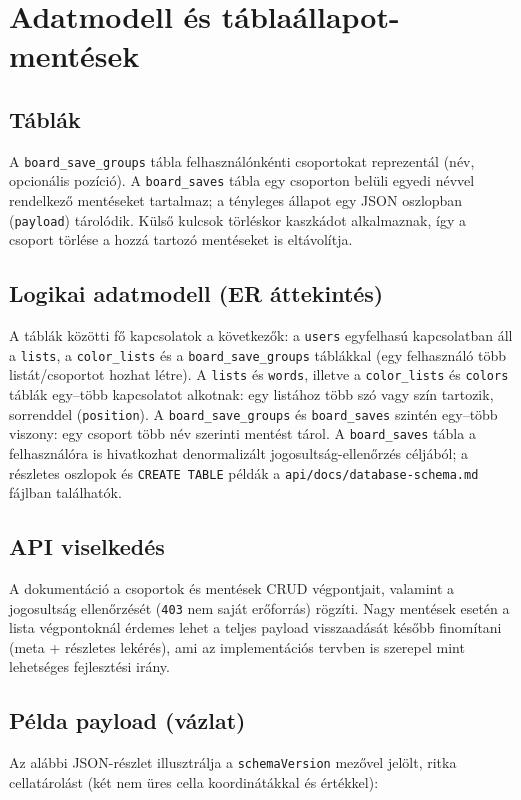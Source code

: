 \documentclass[12pt,a4paper,openany]{book}
\begin{document}
\chapter{Adatmodell és táblaállapot-mentések}
\label{ch:adat}

\section{Táblák}
A \texttt{board\_save\_groups} tábla felhasználónkénti csoportokat reprezentál (név, opcionális pozíció). A \texttt{board\_saves} tábla egy csoporton belüli egyedi névvel rendelkező mentéseket tartalmaz; a tényleges állapot egy JSON oszlopban (\texttt{payload}) tárolódik. Külső kulcsok törléskor kaszkádot alkalmaznak, így a csoport törlése a hozzá tartozó mentéseket is eltávolítja.

\section{Logikai adatmodell (ER áttekintés)}
A táblák közötti fő kapcsolatok a következők: a \texttt{users} egyfelhasú kapcsolatban áll a \texttt{lists}, a \texttt{color\_lists} és a \texttt{board\_save\_groups} táblákkal (egy felhasználó több listát/csoportot hozhat létre). A \texttt{lists} és \texttt{words}, illetve a \texttt{color\_lists} és \texttt{colors} táblák egy–több kapcsolatot alkotnak: egy listához több szó vagy szín tartozik, sorrenddel (\texttt{position}). A \texttt{board\_save\_groups} és \texttt{board\_saves} szintén egy–több viszony: egy csoport több név szerinti mentést tárol. A \texttt{board\_saves} tábla a felhasználóra is hivatkozhat denormalizált jogosultság-ellenőrzés céljából; a részletes oszlopok és \texttt{CREATE TABLE} példák a \texttt{api/docs/database-schema.md} fájlban találhatók.

\section{API viselkedés}
A dokumentáció a csoportok és mentések CRUD végpontjait, valamint a jogosultság ellenőrzését (\texttt{403} nem saját erőforrás) rögzíti. Nagy mentések esetén a lista végpontoknál érdemes lehet a teljes payload visszaadását később finomítani (meta + részletes lekérés), ami az implementációs tervben is szerepel mint lehetséges fejlesztési irány.

\section{Példa payload (vázlat)}
Az alábbi JSON-részlet illusztrálja a \texttt{schemaVersion} mezővel jelölt, ritka cellatárolást (két nem üres cella koordinátákkal és értékkel):
\end{document}
